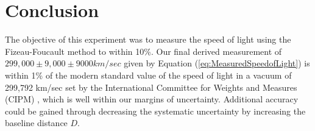 \documentclass[twocolumn]{article}
\begin{document}
\section{Conclusion}
	\label{sec:Conclusion}
	The objective of this experiment was to measure the speed of light using the Fizeau-Foucault method to within 10\%.
	Our final derived measurement of $299,000 \pm 9,000 \pm 9000 km/sec$ given by Equation (\ref{eq:MeasuredSpeedofLight}) is within 1\% of the modern standard value of the speed of light in a vacuum of 299,792 km/sec set by the International Committee for Weights and Measures (CIPM) \cite{_bipm_1984}, which is well within our margins of uncertainty.
	Additional accuracy could be gained through decreasing the systematic uncertainty by increasing the baseline distance $D$.
	


\end{document}
